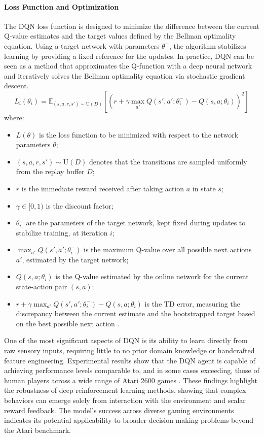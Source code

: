 \documentclass[12pt,a4paper]{report}
\begin{document}
\paragraph{Loss Function and Optimization}
The DQN loss function is designed to minimize the difference between the current Q-value estimates and the target values defined by the Bellman optimality equation. Using a target network with parameters $\theta^-$, the algorithm stabilizes learning by providing a fixed reference for the updates. In practice, DQN can be seen as a method that approximates the Q-function with a deep neural network and iteratively solves the Bellman optimality equation via stochastic gradient descent.
\[
L_i(\theta_i) = \mathbb{E}_{(s,a,r,s') \sim \mathrm{U}(D)}\left[\left(r + \gamma 
\max_{a'} Q(s', a'; \theta^-_i) - Q(s, a; \theta_i)\right)^2\right]
\]
\noindent where:
\begin{itemize}
    \item $L(\theta)$ is the loss function to be minimized with respect to the network parameters $\theta$;
    \item $(s, a, r, s') \sim \mathrm{U}(D)$ denotes that the transitions are sampled uniformly from the replay buffer $D$;
    \item $r$ is the immediate reward received after taking action $a$ in state $s$;
    \item $\gamma \in [0,1)$ is the discount factor;
    \item $\theta^-_i$ are the parameters of the target network, kept fixed during updates to stabilize training, at iteration $i$;
    \item $\max_{a'} Q(s', a'; \theta^-_i)$ is the maximum Q-value over all possible next actions $a'$, estimated by the target network;
    \item $Q(s, a; \theta_i)$ is the Q-value estimated by the online network for the current state-action pair $(s, a)$;
    \item $r + \gamma \max_{a'} Q(s', a'; \theta^-_i) - Q(s, a; \theta_i)$ is the TD error, measuring the discrepancy between the current estimate and the bootstrapped target based on the best possible next action \cite{chiave1}.
\end{itemize}
One of the most significant aspects of DQN is its ability to learn directly from raw sensory inputs, requiring little to no prior domain knowledge or handcrafted feature engineering. Experimental results show that the DQN agent is capable of achieving performance levels comparable to, and in some cases exceeding, those of human players across a wide range of Atari 2600 games \cite{chiave7}. These findings highlight the robustness of deep reinforcement learning methods, showing that complex behaviors can emerge solely from interaction with the environment and scalar reward feedback. The model's success across diverse gaming environments indicates its potential applicability to broader decision-making problems beyond the Atari benchmark.
\end{document}
